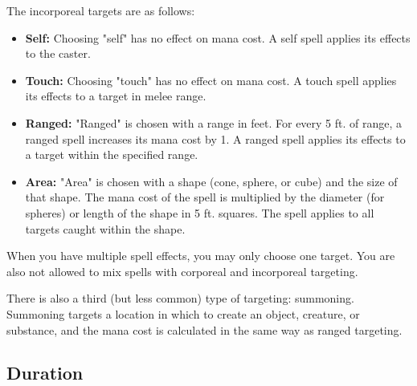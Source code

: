 The incorporeal targets are as follows:
\begin{itemize}
    \item \textbf{Self:} Choosing "self" has no effect on mana cost. A self
        spell applies its effects to the caster.
    \item \textbf{Touch:} Choosing "touch" has no effect on mana cost. A touch
        spell applies its effects to a target in melee range.
    \item \textbf{Ranged:} "Ranged" is chosen with a range in feet. For every
        5 ft. of range, a ranged spell increases its mana cost by 1. A ranged
        spell applies its effects to a target within the specified range.
    \item \textbf{Area:} "Area" is chosen with a shape (cone, sphere, or cube)
        and the size of that shape. The mana cost of the spell is multiplied
        by the diameter (for spheres) or length of the shape in 5 ft. squares.
        The spell applies to all targets caught within the shape.
\end{itemize}

When you have multiple spell effects, you may only choose one target. You are
also not allowed to mix spells with corporeal and incorporeal targeting.

There is also a third (but less common) type of targeting: summoning. Summoning
targets a location in which to create an object, creature, or substance, and
the mana cost is calculated in the same way as ranged targeting.

\subsection{Duration}

